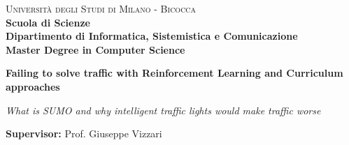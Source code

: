 \documentclass[a4paper,10pt,oneside]{book}
\begin{document}
    
    \begin{titlepage}
        
        \noindent
        \begin{minipage}[t]{0.19\textwidth}
        \end{minipage}
        \begin{minipage}[t]{0.81\textwidth}
        {
                {\textsc{Università degli Studi di Milano - Bicocca}} \\
                \textbf{Scuola di Scienze} \\
                \textbf{Dipartimento di Informatica, Sistemistica e Comunicazione} \\
                \textbf{Master Degree in Computer Science} \\
                \par
        }
        \end{minipage}
        
	\vspace{40mm}
        
	\begin{center}
            {\LARGE{
                    \textbf{Failing to solve traffic with Reinforcement Learning and Curriculum approaches}
                    \par
            }}
            {\large{
                    \textit{What is SUMO and why intelligent traffic lights would make traffic worse}
                    \par
            }}
        \end{center}
        
        \vspace{50mm}

        \noindent
        {\large \textbf{Supervisor:} Prof. Giuseppe Vizzari}
        
        \vspace{15mm}


\end{titlepage}
\end{document}
